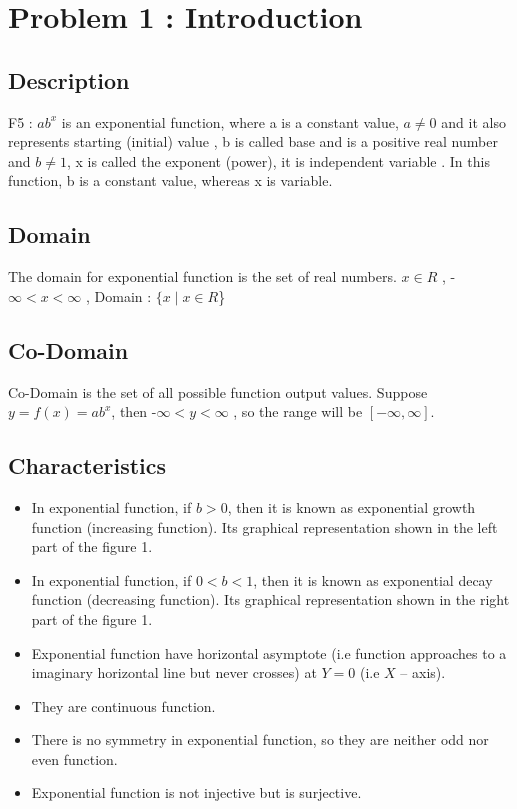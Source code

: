 \documentclass[12pt, a4paper]{article}
\begin{document}
\tableofcontents
\newpage

\section{Problem 1 : Introduction}
\subsection{Description}

F5 : $ab^x$ is an exponential function, where a is a constant value, $a \ne 0$ and it also represents starting (initial) value , b is called base and is a positive real number and $b \ne 1$, x is called the exponent (power), it is independent variable . In this function, b is a constant value, whereas x is variable.

\subsection{Domain}

The domain for exponential function is the set of real numbers. 
\newline $x \in R$ ,  -$\infty < x <\infty$ , Domain : $\{x \mid x \in R$\}

\subsection{Co-Domain}

Co-Domain is the set of all possible function output values.
\newline Suppose $y = f(x) = ab^x $, then -$\infty < y <\infty$ , so the range will be $[-\infty,\infty]$.

\subsection{Characteristics}
\begin{itemize}
    \item In exponential function, if $ b > 0 $, then it is known as exponential growth function (increasing function). Its graphical representation shown in the left part of the figure 1.
    \item In exponential function, if $ 0 < b < 1$, then it is known as exponential decay function (decreasing function). Its graphical representation shown in the right part of the figure 1.
    \item Exponential function have horizontal asymptote (i.e function approaches to a imaginary horizontal line but never crosses) at $ Y=0 $ (i.e $ X $ – axis).
    \item They are continuous function.
    \item There is no symmetry in exponential function, so they are neither odd nor even function.
    \item Exponential function is not injective but is surjective. 
\end{itemize}
\end{document}
